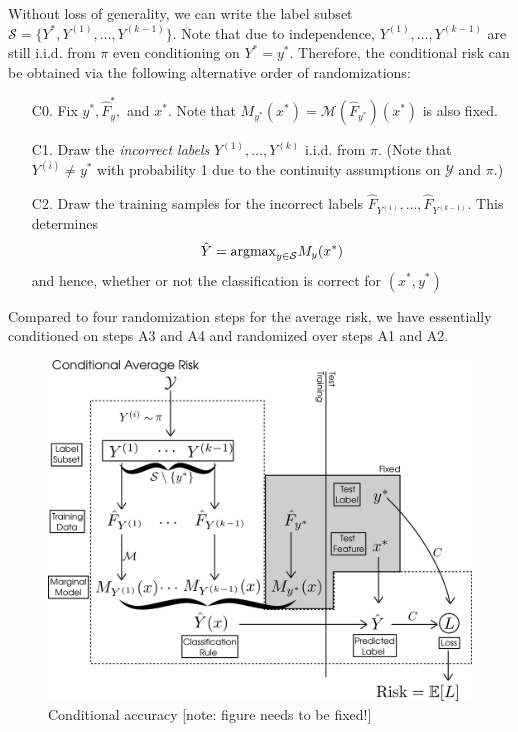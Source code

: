 Without loss of generality, we can write the label subset $\mathcal{S}
= \{Y^*, Y^{(1)},\hdots, Y^{(k-1)}\}$.  Note that due to independence,
$Y^{(1)},\hdots, Y^{(k-1)}$ are still i.i.d. from $\pi$ even
conditioning on $Y^* = y^*.$ Therefore, the conditional risk can be
obtained via the following alternative order of randomizations:
\begin{enumerate}
\item[C0.] 
Fix $y^*, \hat{F}_y^*,$ and $x^*$.  Note that $M_{y^*}(x^*)
= \mathcal{M}(\hat{F}_{y^*})(x^*)$ is also fixed.
\item[C1.]
Draw the \emph{incorrect labels} $Y^{(1)},\hdots, Y^{(k)}$ i.i.d. from
$\pi$.  (Note that $Y^{(i)} \neq y^*$ with probability 1 due to the
continuity assumptions on $\mathcal{Y}$ and $\pi$.)
\item[C2.]
Draw the training samples for the incorrect labels
$\hat{F}_{Y^{(1)}},\hdots, \hat{F}_{Y^{(k-1)}}$.  This determines
\[
\hat{Y} = \text{argmax}_{y \in \mathcal{S}} M_y(x^*)
\]
and hence, whether or not the classification is correct for $(x^*, y^*)$
\end{enumerate}
Compared to four randomization steps for the average risk, we have
essentially conditioned on steps A3 and A4 and randomized over steps
A1 and A2.

\begin{figure}[h]
\centering
\includegraphics[scale = 0.3]{../extrapolation_figures/conditional_risk.png}
\caption{Conditional accuracy [note: figure needs to be fixed!]}\label{fig:conditional_risk}
\end{figure}

